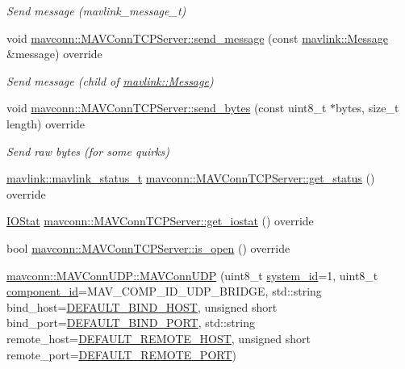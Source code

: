 \begin{DoxyCompactItemize}
\begin{DoxyCompactList}\small\item\em Send message (mavlink\+\_\+message\+\_\+t) \end{DoxyCompactList}\item 
void \mbox{\hyperlink{group__mavconn_ga8e3d7a81031fe54f3326f2ea4ccfa2ef}{mavconn\+::\+M\+A\+V\+Conn\+T\+C\+P\+Server\+::send\+\_\+message}} (const \mbox{\hyperlink{structmavlink_1_1Message}{mavlink\+::\+Message}} \&message) override
\begin{DoxyCompactList}\small\item\em Send message (child of \mbox{\hyperlink{structmavlink_1_1Message}{mavlink\+::\+Message}}) \end{DoxyCompactList}\item 
void \mbox{\hyperlink{group__mavconn_ga4eedf8da39d9dee8cf84074d010ddf0d}{mavconn\+::\+M\+A\+V\+Conn\+T\+C\+P\+Server\+::send\+\_\+bytes}} (const uint8\+\_\+t $\ast$bytes, size\+\_\+t length) override
\begin{DoxyCompactList}\small\item\em Send raw bytes (for some quirks) \end{DoxyCompactList}\item 
\mbox{\hyperlink{include__v2_80_2mavlink__types_8h_aec6f7af3879252822d8fb108e97aafc2}{mavlink\+::mavlink\+\_\+status\+\_\+t}} \mbox{\hyperlink{group__mavconn_gab139fa8d7e65c0de256f7d9dee0d0f30}{mavconn\+::\+M\+A\+V\+Conn\+T\+C\+P\+Server\+::get\+\_\+status}} () override
\item 
\mbox{\hyperlink{structmavconn_1_1MAVConnInterface_1_1IOStat}{I\+O\+Stat}} \mbox{\hyperlink{group__mavconn_ga7fd83c9a2233baa30aff24b6f3c8dd25}{mavconn\+::\+M\+A\+V\+Conn\+T\+C\+P\+Server\+::get\+\_\+iostat}} () override
\item 
bool \mbox{\hyperlink{group__mavconn_ga7bcb8a571a040f61ad2b61f002edc381}{mavconn\+::\+M\+A\+V\+Conn\+T\+C\+P\+Server\+::is\+\_\+open}} () override
\item 
\mbox{\hyperlink{group__mavconn_ga22deee111faac2fde80a0affc6c29245}{mavconn\+::\+M\+A\+V\+Conn\+U\+D\+P\+::\+M\+A\+V\+Conn\+U\+DP}} (uint8\+\_\+t \mbox{\hyperlink{setHome_8cpp_a83150acb88d810ae6864b4c125324ed6}{system\+\_\+id}}=1, uint8\+\_\+t \mbox{\hyperlink{setHome_8cpp_adc84285d5da2c4fa9721d0a32d5e41a7}{component\+\_\+id}}=M\+A\+V\+\_\+\+C\+O\+M\+P\+\_\+\+I\+D\+\_\+\+U\+D\+P\+\_\+\+B\+R\+I\+D\+GE, std\+::string bind\+\_\+host=\mbox{\hyperlink{group__mavconn_ga62467db7651e86bb5428c4288356f813}{D\+E\+F\+A\+U\+L\+T\+\_\+\+B\+I\+N\+D\+\_\+\+H\+O\+ST}}, unsigned short bind\+\_\+port=\mbox{\hyperlink{group__mavconn_ga330f03ed06a3e027ec7be74426dc646b}{D\+E\+F\+A\+U\+L\+T\+\_\+\+B\+I\+N\+D\+\_\+\+P\+O\+RT}}, std\+::string remote\+\_\+host=\mbox{\hyperlink{group__mavconn_ga7a03f4b69e2791a742717516b6421466}{D\+E\+F\+A\+U\+L\+T\+\_\+\+R\+E\+M\+O\+T\+E\+\_\+\+H\+O\+ST}}, unsigned short remote\+\_\+port=\mbox{\hyperlink{group__mavconn_ga25daeb4235691fdf52da1551bf93bc88}{D\+E\+F\+A\+U\+L\+T\+\_\+\+R\+E\+M\+O\+T\+E\+\_\+\+P\+O\+RT}})

\end{DoxyCompactItemize}
